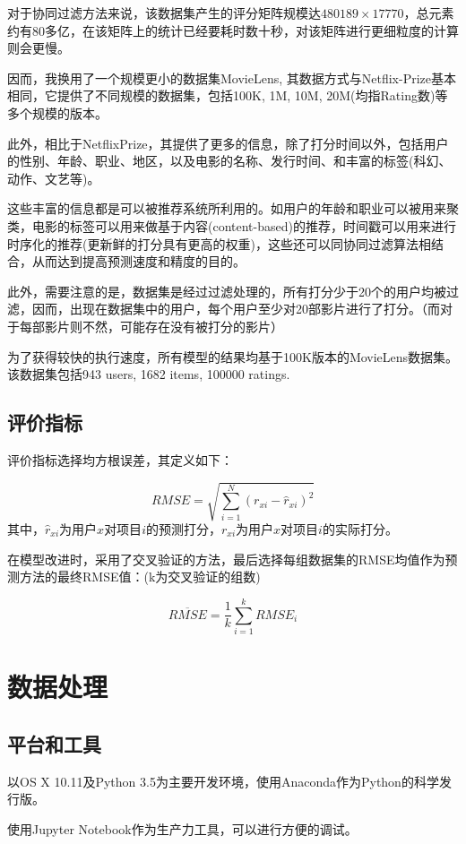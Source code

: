 \documentclass[utf8, a4paper,11pt, onecolumn]{ctexart}
\begin{document}
\begin{spacing}{1.3}
对于协同过滤方法来说，该数据集产生的评分矩阵规模达$480189 \times 17770$，总元素约有80多亿，在该矩阵上的统计已经要耗时数十秒，对该矩阵进行更细粒度的计算则会更慢。

因而，我换用了一个规模更小的数据集MovieLens, 其数据方式与Netflix-Prize基本相同，它提供了不同规模的数据集，包括100K, 1M, 10M, 20M(均指Rating数)等多个规模的版本。

此外，相比于NetflixPrize，其提供了更多的信息，除了打分时间以外，包括用户的性别、年龄、职业、地区，以及电影的名称、发行时间、和丰富的标签(科幻、动作、文艺等)。

这些丰富的信息都是可以被推荐系统所利用的。如用户的年龄和职业可以被用来聚类，电影的标签可以用来做基于内容(content-based)的推荐，时间戳可以用来进行时序化的推荐(更新鲜的打分具有更高的权重)，这些还可以同协同过滤算法相结合，从而达到提高预测速度和精度的目的。

此外，需要注意的是，数据集是经过过滤处理的，所有打分少于20个的用户均被过滤，因而，出现在数据集中的用户，每个用户至少对20部影片进行了打分。（而对于每部影片则不然，可能存在没有被打分的影片）

为了获得较快的执行速度，所有模型的结果均基于100K版本的MovieLens数据集。该数据集包括943 users, 1682 items, 100000 ratings.

\subsection{评价指标}
\label{评价指标}
评价指标选择均方根误差，其定义如下：

\[RMSE = \sqrt{\sum_{i = 1}^{N}(r_{xi} - \hat{r}_{xi})^{2}}\]
其中，$\hat{r}_{xi}$为用户$x$对项目$i$的预测打分，$r_{xi}$为用户$x$对项目$i$的实际打分。

在模型改进时，采用了交叉验证的方法，最后选择每组数据集的RMSE均值作为预测方法的最终RMSE值：(k为交叉验证的组数)

\[\overline{RMSE} = \frac{1}{k}\sum_{i=1}^{k}RMSE_{i}\]

\section{数据处理}

\subsection{平台和工具}

以OS X 10.11及Python 3.5为主要开发环境，使用Anaconda作为Python的科学发行版。

使用Jupyter Notebook作为生产力工具，可以进行方便的调试。


\end{spacing}
\end{document}

